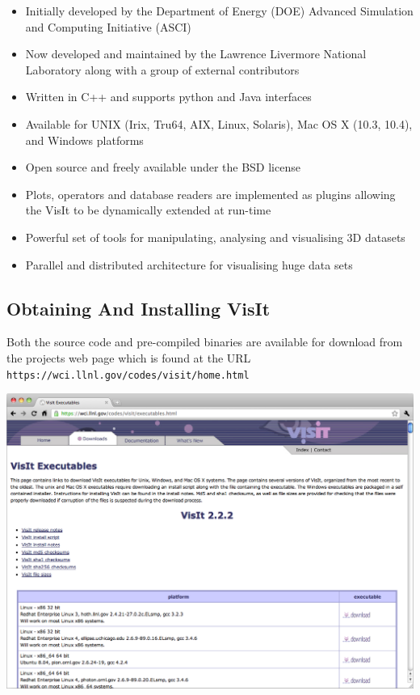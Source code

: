   \begin{itemize}
  \item
    Initially developed by the Department of Energy (DOE) Advanced Simulation
    and Computing Initiative (ASCI) 
  \item
    Now developed and maintained by the Lawrence Livermore National Laboratory
    along with a group of external contributors
  \item
    Written in C++ and supports python and Java interfaces
  \item
    Available for UNIX (Irix, Tru64, AIX, Linux, Solaris), Mac OS X
    (10.3, 10.4), and Windows platforms
  \item
    Open source and freely available under the BSD license
  \item
    Plots, operators and database readers are implemented as plugins allowing
    the VisIt to be dynamically extended at run-time
  \item
    Powerful set of tools for manipulating, analysing and visualising 3D
    datasets
  \item
    Parallel and distributed architecture for visualising huge data sets
  \end{itemize}

\subsection{Obtaining And Installing VisIt}
  Both the source code and pre-compiled binaries are available for download
  from the projects web page which is found at the URL
  {\tt https://wci.llnl.gov/codes/visit/home.html}

  \begin{center}
    \includegraphics[width=0.8\linewidth]{images/visit_web}
  \end{center}

